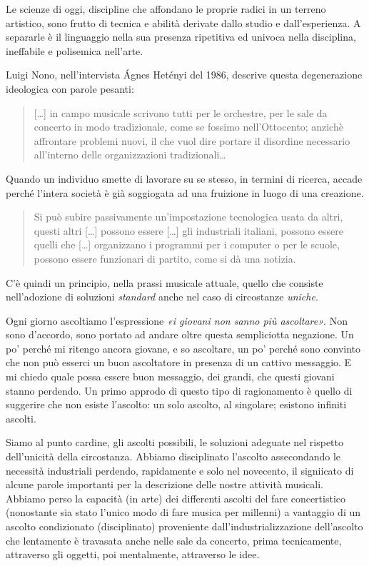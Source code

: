 \documentclass[a4paper,11pt]{article}
\begin{document}
Le scienze di oggi, discipline che affondano le proprie radici in un
terreno artistico, sono frutto di tecnica e abilità derivate dallo
studio e dall'esperienza. A separarle è il linguaggio nella sua presenza
ripetitiva ed univoca nella disciplina, ineffabile e polisemica
nell'arte.

Luigi Nono, nell'intervista Ágnes Hetényi del 1986, descrive questa
degenerazione ideologica con parole pesanti:

\begin{quote}
{[}\ldots{}{]} in campo musicale scrivono tutti per le orchestre, per le sale
da concerto in modo tradizionale, come se fossimo nell'Ottocento;
anzichè affrontare problemi nuovi, il che vuol dire portare il
disordine necessario all'interno delle organizzazioni tradizionali\ldots{}
\end{quote}

Quando un individuo smette di lavorare su se stesso, in termini di
ricerca, accade perché l'intera società è già soggiogata ad una
fruizione in luogo di una creazione.

\begin{quote}
Si può subire passivamente un'impostazione tecnologica usata da altri,
questi altri {[}\ldots{}{]} possono essere {[}\ldots{}{]} gli industriali italiani,
possono essere quelli che {[}\ldots{}{]} organizzano i programmi per i
computer o per le scuole, possono essere funzionari di partito, come
si dà una notizia.
\end{quote}

C'è quindi un principio, nella prassi musicale attuale, quello che
consiste nell'adozione di soluzioni \emph{standard} anche nel caso di
circostanze \emph{uniche}.

Ogni giorno ascoltiamo l'espressione \emph{«i giovani non sanno più
ascoltare»}. Non sono d'accordo, sono portato ad andare oltre questa
sempliciotta negazione. Un po' perché mi ritengo ancora giovane, e so
ascoltare, un po' perché sono convinto che non può esserci un buon
ascoltatore in presenza di un cattivo messaggio. E mi chiedo quale possa
essere buon messaggio, dei grandi, che questi giovani stanno perdendo.
Un primo approdo di questo tipo di ragionamento è quello di suggerire
che non esiste l'ascolto: un solo ascolto, al singolare; esistono
infiniti ascolti.

Siamo al punto cardine, gli ascolti possibili, le soluzioni adeguate nel
rispetto dell'unicità della circostanza. Abbiamo disciplinato l'ascolto
assecondando le necessità industriali perdendo, rapidamente e solo nel
novecento, il signiicato di alcune parole importanti per la descrizione
delle nostre attività musicali. Abbiamo perso la capacità (in arte) dei
differenti ascolti del fare concertistico (nonostante sia stato l'unico
modo di fare musica per millenni) a vantaggio di un ascolto condizionato
(disciplinato) proveniente dall'industrializzazione dell'ascolto che
lentamente è travasata anche nelle sale da concerto, prima tecnicamente,
attraverso gli oggetti, poi mentalmente, attraverso le idee.
\end{document}
